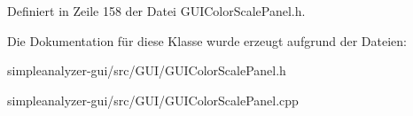 Definiert in Zeile 158 der Datei G\-U\-I\-Color\-Scale\-Panel.\-h.



Die Dokumentation für diese Klasse wurde erzeugt aufgrund der Dateien\-:\begin{DoxyCompactItemize}
\item 
simpleanalyzer-\/gui/src/\-G\-U\-I/G\-U\-I\-Color\-Scale\-Panel.\-h\item 
simpleanalyzer-\/gui/src/\-G\-U\-I/G\-U\-I\-Color\-Scale\-Panel.\-cpp\end{DoxyCompactItemize}
